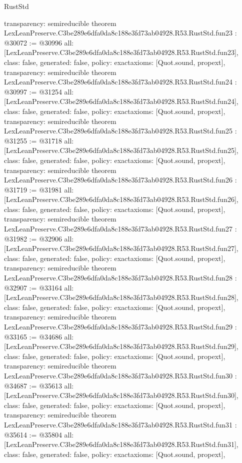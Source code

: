 \begin{lexlean}{RustStd}
\begin{coremodule}
{  transparency: semireducible
}
theorem LexLeanPreserve.C3be289e6dfa0da8c188e3fd73ab04928.R53.RustStd.fun23 : @30072 := @30996 {
  all: [LexLeanPreserve.C3be289e6dfa0da8c188e3fd73ab04928.R53.RustStd.fun23],
  class: false,
  generated: false,
  policy: exact{axioms: [Quot.sound, propext]},
  transparency: semireducible
}
theorem LexLeanPreserve.C3be289e6dfa0da8c188e3fd73ab04928.R53.RustStd.fun24 : @30997 := @31254 {
  all: [LexLeanPreserve.C3be289e6dfa0da8c188e3fd73ab04928.R53.RustStd.fun24],
  class: false,
  generated: false,
  policy: exact{axioms: [Quot.sound, propext]},
  transparency: semireducible
}
theorem LexLeanPreserve.C3be289e6dfa0da8c188e3fd73ab04928.R53.RustStd.fun25 : @31255 := @31718 {
  all: [LexLeanPreserve.C3be289e6dfa0da8c188e3fd73ab04928.R53.RustStd.fun25],
  class: false,
  generated: false,
  policy: exact{axioms: [Quot.sound, propext]},
  transparency: semireducible
}
theorem LexLeanPreserve.C3be289e6dfa0da8c188e3fd73ab04928.R53.RustStd.fun26 : @31719 := @31981 {
  all: [LexLeanPreserve.C3be289e6dfa0da8c188e3fd73ab04928.R53.RustStd.fun26],
  class: false,
  generated: false,
  policy: exact{axioms: [Quot.sound, propext]},
  transparency: semireducible
}
theorem LexLeanPreserve.C3be289e6dfa0da8c188e3fd73ab04928.R53.RustStd.fun27 : @31982 := @32906 {
  all: [LexLeanPreserve.C3be289e6dfa0da8c188e3fd73ab04928.R53.RustStd.fun27],
  class: false,
  generated: false,
  policy: exact{axioms: [Quot.sound, propext]},
  transparency: semireducible
}
theorem LexLeanPreserve.C3be289e6dfa0da8c188e3fd73ab04928.R53.RustStd.fun28 : @32907 := @33164 {
  all: [LexLeanPreserve.C3be289e6dfa0da8c188e3fd73ab04928.R53.RustStd.fun28],
  class: false,
  generated: false,
  policy: exact{axioms: [Quot.sound, propext]},
  transparency: semireducible
}
theorem LexLeanPreserve.C3be289e6dfa0da8c188e3fd73ab04928.R53.RustStd.fun29 : @33165 := @34686 {
  all: [LexLeanPreserve.C3be289e6dfa0da8c188e3fd73ab04928.R53.RustStd.fun29],
  class: false,
  generated: false,
  policy: exact{axioms: [Quot.sound, propext]},
  transparency: semireducible
}
theorem LexLeanPreserve.C3be289e6dfa0da8c188e3fd73ab04928.R53.RustStd.fun30 : @34687 := @35613 {
  all: [LexLeanPreserve.C3be289e6dfa0da8c188e3fd73ab04928.R53.RustStd.fun30],
  class: false,
  generated: false,
  policy: exact{axioms: [Quot.sound, propext]},
  transparency: semireducible
}
theorem LexLeanPreserve.C3be289e6dfa0da8c188e3fd73ab04928.R53.RustStd.fun31 : @35614 := @35804 {
  all: [LexLeanPreserve.C3be289e6dfa0da8c188e3fd73ab04928.R53.RustStd.fun31],
  class: false,
  generated: false,
  policy: exact{axioms: [Quot.sound, propext]},
}
\end{coremodule}
\end{lexlean}
